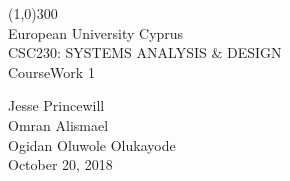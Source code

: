 \documentclass{article}
\begin{document}
\begin{titlepage}
	\begin{center}
		\line(1,0){300} \\
			\huge{European University Cyprus}\\
				[2.25mm]
				\large{CSC230: SYSTEMS ANALYSIS \& DESIGN}\\
					\huge{CourseWork 1} \\
					[14cm]
	\end{center}
	
		\begin{flushright}
			\large {Jesse Princewill \\
				Omran Alismael\\
				Ogidan Oluwole Olukayode\\
				October 20, 2018 \\}
		\end{flushright}
\end{titlepage}
	
\end{document}
